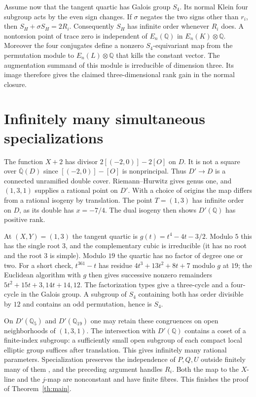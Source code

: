 \documentclass[11pt]{article}
\newcommand{\Q}{\mathbb Q}
\begin{document}
Assume now that the tangent quartic has Galois group $S_4$. Its normal
Klein four subgroup acts by the even sign changes. If $\sigma$ negates
the two signs other than $r_i$, then $S_H+\sigma S_H=2R_i$. Consequently
$S_H$ has infinite order whenever $R_i$ does. A nontorsion point of
trace zero is independent of $E_n(\Q)$ in $E_n(K)\otimes\Q$. Moreover
the four conjugates define a nonzero $S_4$-equivariant map from the
permutation module to $E_n(L)\otimes\Q$ that kills the constant vector.
The augmentation summand of this module is irreducible of dimension
three. Its image therefore gives the claimed three-dimensional rank
gain in the normal closure.

\section{Infinitely many simultaneous specializations}

The function $X+2$ has divisor $2[(-2,0)]-2[O]$ on $D$. It is not a
square over $\overline{\Q}(D)$ since $[(-2,0)]-[O]$ is nonprincipal.
Thus $D'\to D$ is a connected unramified double cover. Riemann--Hurwitz
gives genus one, and $(1,3,1)$ supplies a rational point on $D'$.
With a choice of origins the map differs from a rational isogeny by
translation. The point $T=(1,3)$ has infinite order on $D$, as its
double has $x=-7/4$. The dual isogeny then shows $D'(\Q)$ has positive
rank.

At $(X,Y)=(1,3)$ the tangent quartic is $g(t)=t^4-4t-3/2$.
Modulo $5$ this has the single root $3$, and the complementary cubic
is irreducible (it has no root and the root $3$ is simple).
Modulo $19$ the quartic has no factor of degree one or two.
For a short check, $t^{361}-t$ has residue
$4t^3+13t^2+8t+7$ modulo $g$ at $19$; the Euclidean algorithm with $g$
then gives successive nonzero remainders
$5t^2+15t+3,14t+14,12$. The factorization types give a three-cycle
and a four-cycle in the Galois group. A subgroup of $S_4$ containing
both has order divisible by $12$ and contains an odd permutation,
hence is $S_4$.

On $D'(\Q_5)$ and $D'(\Q_{19})$ one may retain these congruences on open
neighborhoods of $(1,3,1)$. The intersection with $D'(\Q)$ contains
a coset of a finite-index subgroup: a sufficiently small open subgroup
of each compact local elliptic group suffices after translation.
This gives infinitely many rational parameters. Specialization preserves
the independence of $P,Q,U$ outside finitely many of them
\cite{Silverman}, and the preceding argument handles $R_i$. Both the map
to the $X$-line and the $j$-map are nonconstant and have finite fibres.
This finishes the proof of Theorem~\ref{th:main}.
\end{document}
